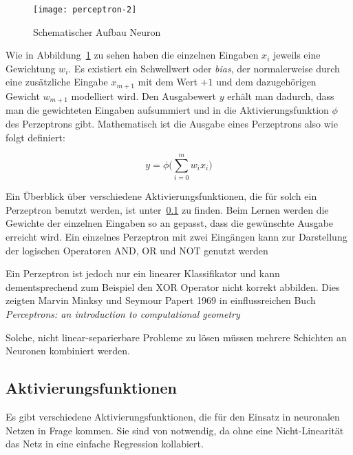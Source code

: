 \begin{figure}[h]
    \centering
	\texttt{[image: perceptron-2]}
	\caption{Schematischer Aufbau Neuron}
	\label{fig:singleNeuron}
\end{figure}

Wie in Abbildung~\ref{fig:singleNeuron} zu sehen haben die einzelnen Eingaben \(x_i\) jeweils eine Gewichtung \(w_i\).
Es existiert ein Schwellwert oder \textit{bias}, der normalerweise 
durch eine zusätzliche Eingabe \(x_{m+1}\) mit dem Wert \(+1\) und dem dazugehörigen Gewicht \(w_{m+1}\) modelliert wird.
Den Ausgabewert \(y\) erhält man dadurch, dass man die gewichteten Eingaben aufsummiert und in die Aktivierungsfunktion \( \phi \) des Perzeptrons gibt.
Mathematisch ist die Ausgabe eines Perzeptrons also wie folgt definiert:

\begin{equation}
	y = \phi \Big( \sum_{i= 0}^{m} w_i x_i \Big)
\end{equation}

Ein Überblick über verschiedene Aktivierungsfunktionen, die für solch ein Perzeptron benutzt werden, ist unter~\ref{sec:activationfuncs} zu finden.
Beim Lernen werden die Gewichte der einzelnen Eingaben so an gepasst, dass die gewünschte Ausgabe erreicht wird.
Ein einzelnes Perzeptron mit zwei Eingängen kann zur Darstellung der logischen Operatoren AND, OR und NOT genutzt werden

Ein Perzeptron ist jedoch nur ein linearer Klassifikator und kann dementsprechend zum Beispiel den XOR Operator nicht korrekt abbilden.
Dies zeigten Marvin Minksy und Seymour Papert 1969 in einflussreichen Buch \textit{Perceptrons: an introduction to computational geometry} 

Solche, nicht linear-separierbare Probleme zu lösen müssen mehrere Schichten an Neuronen kombiniert werden.

\subsection{Aktivierungsfunktionen}
\label{sec:activationfuncs}
Es gibt verschiedene Aktivierungsfunktionen, die für den Einsatz in neuronalen Netzen in Frage kommen.
Sie sind von notwendig, da ohne eine Nicht-Linearität das Netz in eine einfache Regression kollabiert.

